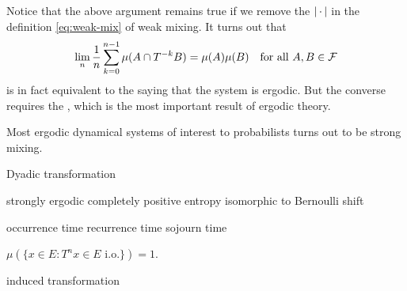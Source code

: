 Notice that the above argument remains true if we remove the $\lvert \,\cdot\, \rvert$ in the definition \eqref{eq:weak-mix} of weak mixing. It turns out that \[
    \lim_n \frac{1}{n} \sum_{k=0}^{n-1} \mu(A \cap T^{-k} B) = \mu(A)\mu(B)\quad \text{for all }A,B\in \mathcal{F}
\] is in fact equivalent to the saying that the system is ergodic. But the converse requires the , which is the most important result of ergodic theory.

Most ergodic dynamical systems of interest to probabilists turns out to be strong mixing.

Dyadic transformation

strongly ergodic
completely positive entropy
isomorphic to Bernoulli shift

occurrence time
recurrence time
sojourn time



\begin{namedthm}
    $\mu(\{x\in E: T^n x\in E \text{ i.o.}\}) = 1$.
\end{namedthm}

\begin{namedthm}
    
\end{namedthm}

\begin{namedthm} \label{thm:Birkhoff-ergodic}
    
\end{namedthm}

induced transformation